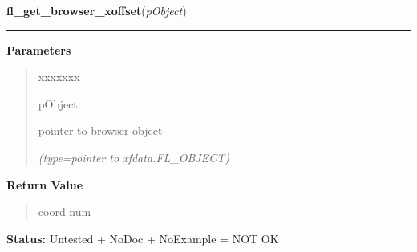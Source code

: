 \hspace{.8\funcindent}\begin{boxedminipage}{\funcwidth}

    \raggedright \textbf{fl\_get\_browser\_xoffset}(\textit{pObject})

    \vspace{-1.5ex}

    \rule{\textwidth}{0.5\fboxrule}
\setlength{\parskip}{2ex}
\setlength{\parskip}{1ex}
      \textbf{Parameters}
      \vspace{-1ex}

      \begin{quote}
        \begin{Ventry}{xxxxxxx}

          \item[pObject]

          pointer to browser object

            {\it (type=pointer to xfdata.FL\_OBJECT)}

        \end{Ventry}

      \end{quote}

      \textbf{Return Value}
    \vspace{-1ex}

      \begin{quote}
      coord num

      \end{quote}

\textbf{Status:} Untested + NoDoc + NoExample = NOT OK



    \end{boxedminipage}

    \label{xformslib:library:fl_get_browser_rel_xoffset}

    \vspace{0.5ex}

